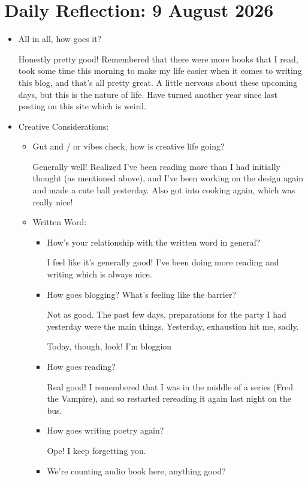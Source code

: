 \documentclass[12pt]{article}
\renewcommand{\,}{\textsuperscript{,}}
\newcommand{\dailyreflect}[1]{\section{Daily Reflection: #1}}
\begin{document}
\dailyreflect{9 August 2026}  
\begin{itemize}  
\item All in all, how goes it?

Honestly pretty good! Remembered that there were more books that I read, took some time this morning to make my life easier when it comes to writing this blog, and that's all pretty great.  
A little nervous about these upcoming days, but this is the nature of life.  
Have turned another year since last posting on this site which is weird.

 \item Creative Considerations:  
 \begin{itemize}  
 \item Gut and / or vibes check, how is creative life going?

Generally well! Realized I've been reading more than I had initially thought (as mentioned above), and I've been working on the design again and made a cute ball yesterday. Also got into cooking again, which was really nice!

 \item Written Word:  
 \begin{itemize}  
 \item How's your relationship with the written word in general?

I feel like it's generally good! I've been doing more reading and writing which is always nice.

\item How goes blogging? What's feeling like the barrier?

Not as good. The past few days, preparations for the party I had yesterday were the main things.  
Yesterday, exhaustion hit me, sadly.

Today, though, look! I'm bloggion

\item How goes reading?

Real good! I remembered that I was in the middle of a series (Fred the Vampire), and so restarted rereading it again last night on the bus.

\item How goes writing poetry again?

Ope! I keep forgetting you.

\item We're counting audio book here, anything good?


\end{itemize}
\end{itemize}
\end{itemize}
\end{document}

